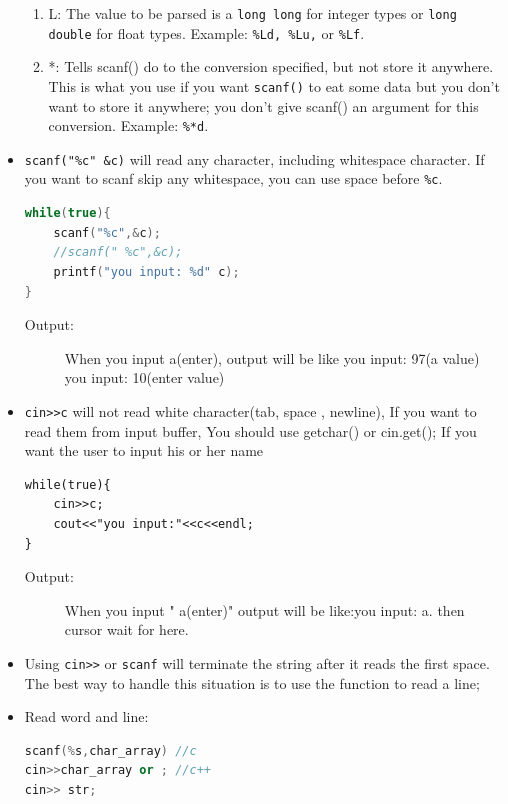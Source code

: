 \documentclass[a4paper,11pt,twoside]{book}
\begin{document}
\begin{itemize}
\begin{enumerate}
		\item L: The value to be parsed is a \texttt{long long} for integer types or \texttt{long double} for float types. Example: \texttt{\%Ld, \%Lu,} or \texttt{\%Lf}.
		
		\item *: Tells scanf() do to the conversion specified, but not store it anywhere. This is what you use if you want \texttt{scanf()} to eat some data but you don't want to store it anywhere; you don't give scanf() an argument for this conversion. Example: \texttt{\%*d}.
	\end{enumerate}
	
	
	\item \texttt{scanf("\%c" \&c)} will read any character, including whitespace character. If you want to scanf skip any whitespace, you can use space before \texttt{\%c}.
	
\begin{lstlisting}[frame=single, language=c++, mathescape=true]
while(true){
	scanf("%c",&c);
	//scanf(" %c",&c);
	printf("you input: %d" c);
}
\end{lstlisting}
\begin{description}
	\item[Output:] When you input a(enter), output will be like
	you input: 97(a value)
	you input: 10(enter value)
\end{description}
	
	\item \verb=cin>>c= will not read white character(tab, space , newline), If you want to read them from input buffer, You should use getchar() or cin.get(); If you want the user to input his or her name
\begin{lstlisting}
while(true){
	cin>>c;
	cout<<"you input:"<<c<<endl;
}
	\end{lstlisting}
	\begin{description}
		\item[Output:] When you input  "    a(enter)"
		output will be like:you input:  a. then cursor wait for here.
	\end{description}
	
	\item Using \verb=cin>>= or \texttt{scanf} will terminate the string after it reads the first space. The best way to handle this situation is to use the function to read a line;
	
	\item Read word and line:
\begin{lstlisting}[frame=single, language=c++]
scanf(%s,char_array) //c
cin>>char_array or ; //c++
cin>> str;
	

\end{lstlisting}
\end{itemize}
\end{document}
